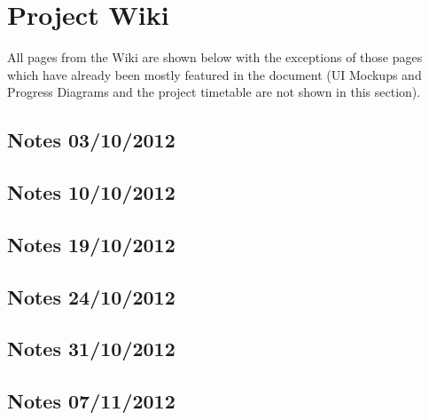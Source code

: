 \pagebreak
\section{Project Wiki}
\label{sec:wiki}

All pages from the Wiki are shown below with the exceptions of those pages
which have already been mostly featured in the document (UI Mockups and
Progress Diagrams and the project timetable are not shown in this section).

\subsection{ Notes 03/10/2012 }


\subsection{ Notes 10/10/2012 }


\subsection{ Notes 19/10/2012 }


\subsection{ Notes 24/10/2012 }


\subsection{ Notes 31/10/2012 }


\subsection{ Notes 07/11/2012 }


